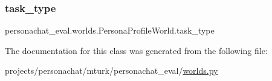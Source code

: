 \mbox{\label{classpersonachat__eval_1_1worlds_1_1PersonaProfileWorld_aeae2093b4e378e2e08d19e53f1fecfe6}} 
\subsubsection{\texorpdfstring{task\+\_\+type}{task\_type}}
{\footnotesize\ttfamily personachat\+\_\+eval.\+worlds.\+Persona\+Profile\+World.\+task\+\_\+type}



The documentation for this class was generated from the following file\+:\begin{DoxyCompactItemize}
\item 
projects/personachat/mturk/personachat\+\_\+eval/\hyperlink{projects_2personachat_2mturk_2personachat__eval_2worlds_8py}{worlds.\+py}\end{DoxyCompactItemize}
